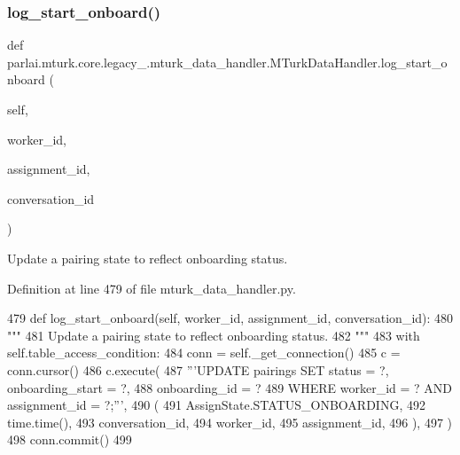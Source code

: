\subsubsection{\texorpdfstring{log\+\_\+start\+\_\+onboard()}{log\_start\_onboard()}}
{\footnotesize\ttfamily def parlai.\+mturk.\+core.\+legacy\+\_.\+mturk\+\_\+data\+\_\+handler.\+M\+Turk\+Data\+Handler.\+log\+\_\+start\+\_\+onboard (\begin{DoxyParamCaption}\item[{}]{self,  }\item[{}]{worker\+\_\+id,  }\item[{}]{assignment\+\_\+id,  }\item[{}]{conversation\+\_\+id }\end{DoxyParamCaption})}

\begin{DoxyVerb}Update a pairing state to reflect onboarding status.
\end{DoxyVerb}
 

Definition at line 479 of file mturk\+\_\+data\+\_\+handler.\+py.


\begin{DoxyCode}
479     \textcolor{keyword}{def }log\_start\_onboard(self, worker\_id, assignment\_id, conversation\_id):
480         \textcolor{stringliteral}{"""}
481 \textcolor{stringliteral}{        Update a pairing state to reflect onboarding status.}
482 \textcolor{stringliteral}{        """}
483         with self.table\_access\_condition:
484             conn = self.\_get\_connection()
485             c = conn.cursor()
486             c.execute(
487                 \textcolor{stringliteral}{'''UPDATE pairings SET status = ?, onboarding\_start = ?,}
488 \textcolor{stringliteral}{                         onboarding\_id = ?}
489 \textcolor{stringliteral}{                         WHERE worker\_id = ? AND assignment\_id = ?;'''},
490                 (
491                     AssignState.STATUS\_ONBOARDING,
492                     time.time(),
493                     conversation\_id,
494                     worker\_id,
495                     assignment\_id,
496                 ),
497             )
498             conn.commit()
499 
\end{DoxyCode}
\mbox{\label{classparlai_1_1mturk_1_1core_1_1legacy__2018_1_1mturk__data__handler_1_1MTurkDataHandler_a79a42fda72f56a54462c91242fb0852b}} 
